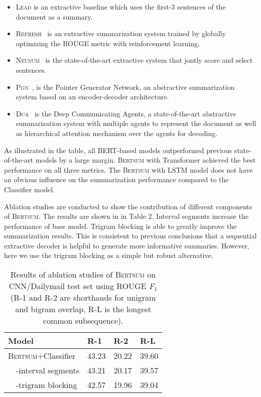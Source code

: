 \documentclass[11pt,a4paper]{article}
\begin{document}
        
    \begin{itemize}
        \item \textsc{Lead} is an extractive baseline which uses the first-3 sentences of the document as a summary.
        
        \item  \textsc{Refresh}~\citep{narayan2018ranking} is an extractive
        summarization system trained by globally optimizing the ROUGE
        metric with reinforcement learning.  
        
        \item \textsc{Neusum}~\citep{zhou2018neural} is the state-of-the-art extractive system that jontly score and select sentences.
        \item  
        \textsc{Pgn}~\citep{see-acl17}, is the Pointer Generator Network, an abstractive summarization system based
        on an encoder-decoder architecture.  
        
        \item \textsc{Dca}~\citep{celikyilmaz2018deep} is the Deep Communicating Agents, a
        state-of-the-art abstractive summarization system with 
        multiple agents  to represent the document as well as
        hierarchical attention mechanism over the agents for decoding.
    \end{itemize}   




    
      As illustrated in the table, all   BERT-based models outperformed previous state-of-the-art models by a large margin. \textsc{Bertsum} with Transformer achieved the best performance on all three metrics. The \textsc{Bertsum} with LSTM model does not have an obvious influence on the summarization performance compared to the  Classifier model. 
    
    Ablation studies  are conducted to show the contribution of different components of \textsc{Bertsum}. The results are shown in in Table 2. Interval segments  increase the performance of base model. Trigram blocking is able to greatly improve the summarization results. This is consistent to previous conclusions that a sequential extractive decoder is helpful to generate more informative summaries. However, here we  use the trigram blocking as a simple but robust alternative.

        \begin{table}[!htbp]
    \begin{tabular}{l|lll}
        Model              & R-1    & R-2    & R-L    \\ \hline
        \textsc{Bertsum}+Classifier  & 43.23  & 20.22 & 39.60\\
        ~~-interval segments & 43.21 & 20.17 &  39.57 \\
        ~~-trigram blocking  & 42.57  & 19.96 & 39.04
    \end{tabular}
    \caption{Results of ablation studies of \textsc{Bertsum} on CNN/Dailymail test set using  ROUGE $F_1$ (R-1 and R-2 are
        shorthands for unigram and bigram overlap, R-L  is the
        longest common subsequence).}
    
\end{table}
\end{document}
